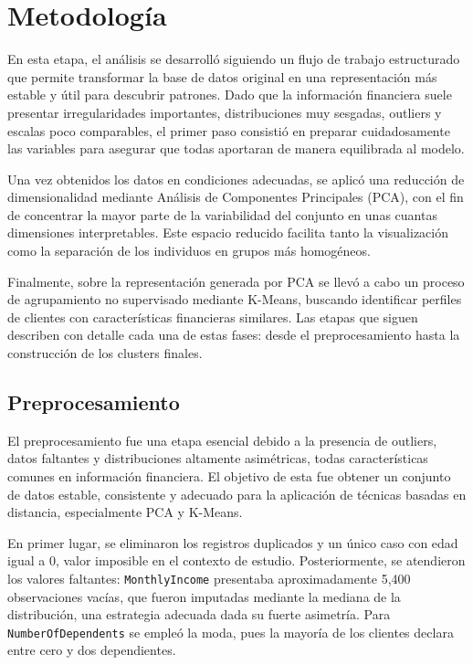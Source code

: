 \documentclass[a4paper,12pt]{article}
\begin{document}
\section{Metodología}

En esta etapa, el análisis se desarrolló siguiendo un flujo de trabajo estructurado que permite 
transformar la base de datos original en una representación más estable y útil para descubrir 
patrones. Dado que la información financiera suele presentar irregularidades importantes, distribuciones 
muy sesgadas, outliers y escalas poco comparables, el primer paso consistió en preparar 
cuidadosamente las variables para asegurar que todas aportaran de manera equilibrada al modelo.

Una vez obtenidos los datos en condiciones adecuadas, se aplicó una reducción de dimensionalidad 
mediante Análisis de Componentes Principales (PCA), con el fin de concentrar la mayor parte de la 
variabilidad del conjunto en unas cuantas dimensiones interpretables. Este espacio reducido facilita 
tanto la visualización como la separación de los individuos en grupos más homogéneos.

Finalmente, sobre la representación generada por PCA se llevó a cabo un proceso de agrupamiento no 
supervisado mediante K-Means, buscando identificar perfiles de clientes con características 
financieras similares. Las etapas que siguen describen con detalle cada una de estas fases: desde el 
preprocesamiento hasta la construcción de los clusters finales.


\subsection{Preprocesamiento}
El preprocesamiento fue una etapa esencial debido a la presencia de outliers, datos faltantes y distribuciones altamente 
asimétricas, todas características comunes en información financiera. El objetivo de esta fue obtener un conjunto de datos 
estable, consistente y adecuado para la aplicación de técnicas basadas en distancia, especialmente PCA y K-Means. 

En primer lugar, se eliminaron los registros duplicados y un único caso con edad igual a 0, valor imposible en el contexto de 
estudio. Posteriormente, se atendieron los valores faltantes: \texttt{MonthlyIncome} presentaba aproximadamente 5,400 
observaciones vacías, que fueron imputadas mediante la mediana de la distribución, una estrategia adecuada dada su fuerte asimetría. 
Para \texttt{NumberOfDependents} se empleó la moda, pues la mayoría de los clientes declara entre cero y dos dependientes. 
\end{document}
